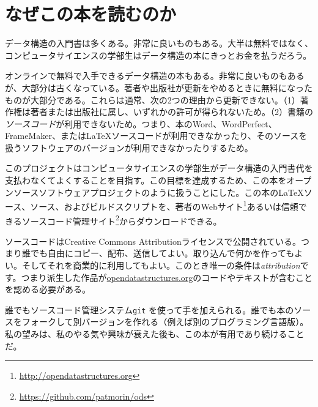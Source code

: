 \chapter*{なぜこの本を読むのか}

データ構造の入門書は多くある。非常に良いものもある。大半は無料ではなく、コンピュータサイエンスの学部生はデータ構造の本にきっとお金を払うだろう。

オンラインで無料で入手できるデータ構造の本もある。非常に良いものもあるが、大部分は古くなっている。著者や出版社が更新をやめるときに無料になったものが大部分である。これらは通常、次の2つの理由から更新できない。（1）著作権は著者または出版社に属し、いずれかの許可が得られないため。（2）書籍の\emph{ソースコード}が利用できないため。つまり、本のWord、WordPerfect、FrameMaker、または\LaTeX{}ソースコードが利用できなかったり、そのソースを扱うソフトウェアのバージョンが利用できなかったりするため。

このプロジェクトはコンピュータサイエンスの学部生がデータ構造の入門書代を支払わなくてよくすることを目指す。この目標を達成するため、この本をオープンソースソフトウェアプロジェクトのように扱うことにした。この本の\LaTeX{}ソース、\lang{}ソース、およびビルドスクリプトを、著者のWebサイト\footnote {\url{http://opendatastructures.org}}あるいは信頼できるソースコード管理サイト\footnote {\url{https://github.com/patmorin/ods}}からダウンロードできる。

ソースコードはCreative Commons Attributionライセンスで公開されている。つまり誰でも自由にコピー、配布、送信してよい。取り込んで何かを作ってもよい。そしてそれを商業的に利用してもよい。このとき唯一の条件は\emph{attribution}です。つまり派生した作品が\url{opendatastructures.org}のコードやテキストが含むことを認める必要がある。

誰でもソースコード管理システム\texttt{git} を使って手を加えられる。誰でも本のソースをフォークして別バージョンを作れる（例えば別のプログラミング言語版）。私の望みは、私のやる気や興味が衰えた後も、この本が有用であり続けることだ。

